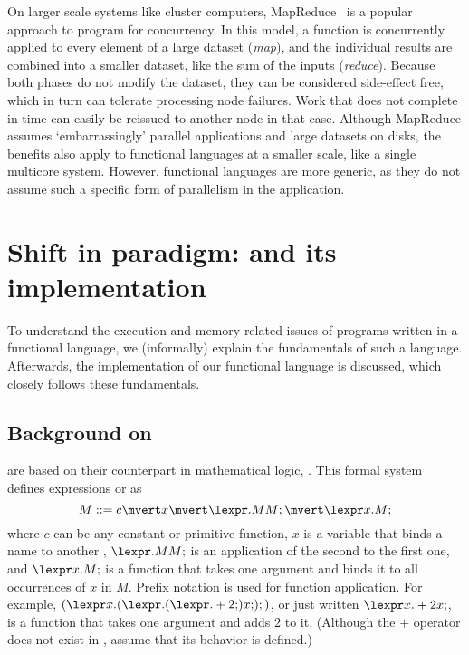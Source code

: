 On larger scale systems like cluster computers, MapReduce~\cite{dean:map_reduce} is a popular approach to program for concurrency.
In this model, a function is concurrently applied to every element of a large dataset (\emph{map}), and the individual results are combined into a smaller dataset, like the sum of the inputs (\emph{reduce}).
Because both phases do not modify the dataset, they can be considered side-effect free, which in turn can tolerate processing node failures.
Work that does not complete in time can easily be reissued to another node in that case.
Although MapReduce assumes `embarrassingly' parallel applications and large datasets on disks, the benefits also apply to functional languages at a smaller scale, like a single multicore system.
However, functional languages are more generic, as they do not assume such a specific form of parallelism in the application.


\section{Shift in paradigm: \lcalc and its implementation}

\label{s:concurrency:fp}
To understand the execution and memory related issues of programs written in a functional language, we (informally) explain the fundamentals of such a language.
Afterwards, the implementation of our functional language is discussed, which closely follows these fundamentals.

\subsection{Background on \lcalc}

\label{s:concurrency:lambda}

 are based on their counterpart in mathematical logic, \lcalc*.
This formal system defines expressions or \emph{\lterms*} as
\begin{equation*}
M ::= c \mvert x \mvert \lexpr.M M; \mvert \lexpr x.M;
\end{equation*}
where $c$ can be any constant or primitive function, $x$ is a variable that binds a name to another \lterm, $\lexpr.M M;$ is an application of the second \lterm to the first one, and $\lexpr x.M;$ is a function that takes one argument and binds it to all occurrences of $x$ in $M$.
Prefix notation is used for function application.
For example, $(\lexpr x.({\lexpr.({\lexpr.+ 2;}) x;});)$, or just written $\lexpr x.+ 2 x;$, is a function that takes one argument and adds $2$ to it.
(Although the $+$ operator does not exist in \lcalc, assume that its behavior is defined.)

